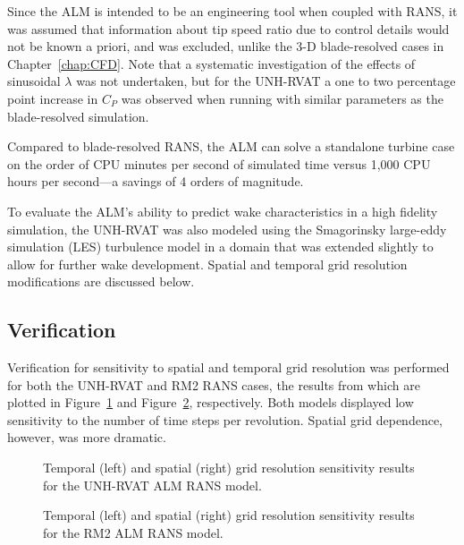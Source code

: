 Since the ALM is intended to be an engineering tool when coupled with RANS, it
was assumed that information about tip speed ratio due to control details would
not be known a priori, and was excluded, unlike the 3-D blade-resolved cases in
Chapter~\ref{chap:CFD}. Note that a systematic investigation of the effects of
sinusoidal $\lambda$ was not undertaken, but for the UNH-RVAT a one to two
percentage point increase in $C_P$ was observed when running with similar
parameters as the blade-resolved simulation.

Compared to blade-resolved RANS, the ALM can solve a standalone turbine case on
the order of CPU minutes per second of simulated time versus 1,000 CPU hours per
second---a savings of 4 orders of magnitude.

To evaluate the ALM's ability to predict wake characteristics in a high fidelity
simulation, the UNH-RVAT was also modeled using the Smagorinsky large-eddy
simulation (LES) turbulence model \cite{Smagorinsky1963} in a domain that was
extended slightly to allow for further wake development. Spatial and temporal
grid resolution modifications are discussed below.


\subsection{Verification}

Verification for sensitivity to spatial and temporal grid resolution was
performed for both the UNH-RVAT and RM2 RANS cases, the results from which are
plotted in Figure~\ref{fig:RVAT-ALM-verification} and
Figure~\ref{fig:RM2-ALM-verification}, respectively. Both models displayed low
sensitivity to the number of time steps per revolution. Spatial grid dependence,
however, was more dramatic.


\begin{figure}
    \centering
    
    \caption{Temporal (left) and spatial (right) grid resolution sensitivity
        results for the UNH-RVAT ALM RANS model.}
    
    \label{fig:RVAT-ALM-verification}
\end{figure}

\begin{figure}
    \centering
    
    \caption{Temporal (left) and spatial (right) grid resolution sensitivity
        results for the RM2 ALM RANS model.}
    
    \label{fig:RM2-ALM-verification}
\end{figure}



